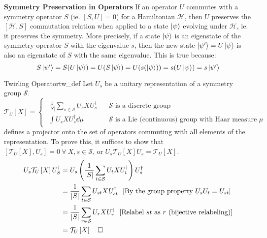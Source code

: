 \documentclass{article}
\newcommand{\qed}{\hfill\square}
\newcommand{\twirl}[2]{\mathcal{T}_{#1}\left[#2\right]}
\newcommand{\hamiltonian}{\mathcal{H}}
\newcommand{\sym}{\mathcal{S}}
\begin{document}
\textbf{Symmetry Preservation in Operators}
If an operator $U$ commutes with a symmetry operator $S$ (ie. $[S, U] = 0$) for a Hamiltonian $\hamiltonian$, then $U$ preserves the $[\hamiltonian, S]$ commutation relation when applied to a state $\ket{\psi}$ evolving under $\hamiltonian$, ie. it preserves the symmetry. More precisely, if a state $\ket{\psi}$ is an eigenstate of the symmetry operator $S$ with the eigenvalue $s$, then the new state $\ket{\psi'} = U\ket{\psi}$ is also an eigenstate of $S$ with the same eigenvalue. This is true because: $$S\ket{\psi'} = S(U\ket{\psi}) = U(S\ket{\psi}) = U(s(\ket{\psi})) = s(U\ket{\psi}) = s\ket{\psi'}$$
\vspace{0.1ex}

\begin{definition}{Twirling Operator}{tw_def}
    Let $U_s$ be a unitary representation of a symmetry group $\sym$. \begin{equation}\twirl{U}{X} = \begin{cases}\begin{aligned}
        \frac{1}{|S|}\sum_{s \in \sym}U_sXU_s^\dagger & ~~~~\sym \text{ is a discrete group}\\
        \int U_sXU_s^\dagger \dd{\mu} & ~~~~ \sym \text{ is a Lie (continuous) group with Haar measure $\mu$}
        \end{aligned}
    \end{cases}\end{equation}
    defines a projector onto the set of operators commuting with all elements of the representation.\cite{meyerExploitingSymmetryVariational2023}
    To prove this, it suffices to show that $[\twirl{U}{X}, U_s] = 0 ~\forall~ X, s \in \sym$, or $U_s \twirl{U}{X}U_s = \twirl{U}{X}$. 
    \begin{equation}
    \begin{split}
        U_s\twirl{U}{X}U_S^\dagger &= U_s\left(\frac{1}{|S|}\sum_{t \in \sym}U_tXU_t^\dagger\right)U_s^\dagger\\
        &= \frac{1}{|S|}\sum_{t \in \sym}U_{st}XU_{st}^\dagger ~~\text{[By the group property $U_sU_t = U_{st}$]}\\
        &= \frac{1}{|S|}\sum_{r \in \sym}U_{r}XU_{r}^\dagger ~~\text{[Relabel $st$ as $r$ (bijective relabeling)]}\\
        &= \twirl{U}{X} ~~~\qed
    \end{split}
    \end{equation}
    
\end{definition}
\end{document}
